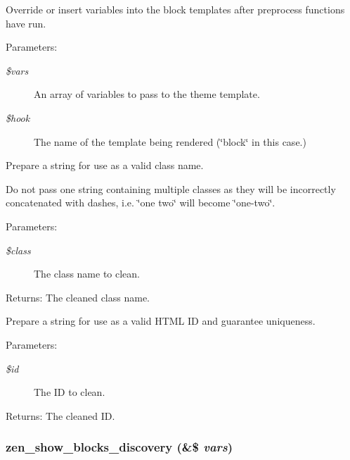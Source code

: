 Override or insert variables into the block templates after preprocess functions have run.

\begin{Desc}
\item[Parameters:]
\begin{description}
\item[{\em \$vars}]An array of variables to pass to the theme template. \item[{\em \$hook}]The name of the template being rendered (\char`\"{}block\char`\"{} in this case.) \end{description}
\end{Desc}


Prepare a string for use as a valid class name.

Do not pass one string containing multiple classes as they will be incorrectly concatenated with dashes, i.e. \char`\"{}one two\char`\"{} will become \char`\"{}one-two\char`\"{}.

\begin{Desc}
\item[Parameters:]
\begin{description}
\item[{\em \$class}]The class name to clean. \end{description}
\end{Desc}
\begin{Desc}
\item[Returns:]The cleaned class name.\end{Desc}
Prepare a string for use as a valid HTML ID and guarantee uniqueness.

\begin{Desc}
\item[Parameters:]
\begin{description}
\item[{\em \$id}]The ID to clean. \end{description}
\end{Desc}
\begin{Desc}
\item[Returns:]The cleaned ID.\end{Desc}
\hypertarget{sites_2all_2themes_2zen_2template_8php_73caa65f5d569efce36a732c0775f3e6}{
\subsubsection[{zen\_\-show\_\-blocks\_\-discovery}]{\setlength{\rightskip}{0pt plus 5cm}zen\_\-show\_\-blocks\_\-discovery (\&\$ {\em vars})}}
\label{sites_2all_2themes_2zen_2template_8php_73caa65f5d569efce36a732c0775f3e6}


